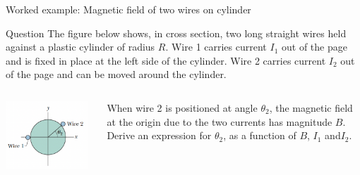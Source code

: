 {
\problemslide

\begin{frame}{Worked example: Magnetic field of two wires on cylinder}

  \begin{blockexmplque}{Question}
    The figure below shows, in cross section, two long straight wires
    held against a plastic cylinder of radius $R$.
    Wire 1 carries current $I_1$ out of the page and is fixed in place at the
    left side of the cylinder. Wire 2 carries current $I_2$ out of the page
    and can be moved around the cylinder.
    \begin{columns}
      \begin{column}{0.45\textwidth}
        \begin{center}
          \includegraphics[width=0.95\textwidth]{./images/problems/lect05_wires_around_cylinder_1}\\
        \end{center}
      \end{column}
      \begin{column}{0.55\textwidth}
        When wire 2 is positioned at angle $\theta_2$, the magnetic field at the
        origin due to the two currents has magnitude $B$.
        Derive an expression for $\theta_2$, as a function of $B$, $I_1$ and$ I_2$.
      \end{column}
    \end{columns}
  \end{blockexmplque}

\end{frame}

}
